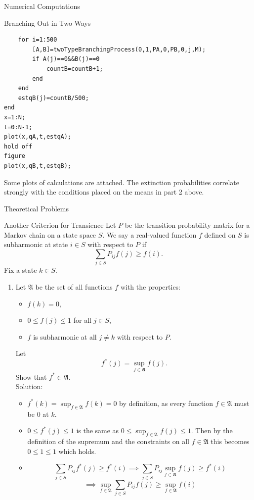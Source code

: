\documentclass[12pt]{article}
\numberwithin{equation}{section}
\begin{document}
\begin{section}{Numerical Computations}
\begin{subsection}{Branching Out in Two Ways}
\begin{enumerate}
\begin{lstlisting}
    for i=1:500
        [A,B]=twoTypeBranchingProcess(0,1,PA,0,PB,0,j,M);
        if A(j)==0&&B(j)==0
            countB=countB+1;
        end
    end
    estqB(j)=countB/500;
end
x=1:N;
t=0:N-1;
plot(x,qA,t,estqA);
hold off
figure
plot(x,qB,t,estqB);
\end{lstlisting}
Some plots of calculations are attached. The extinction probabilities correlate strongly with the conditions placed on the means in part 2 above.
\end{enumerate}
\end{subsection}
\end{section}
\begin{section}{Theoretical Problems}
\begin{subsection}{Another Criterion for Transience}
Let $P$ be the transition probability matrix for a Markov chain on a state space $S$. We say a real-valued function $f$ defined on $S$ is subharmonic at state $i\in S$ with respect to $P$ if
$$\sum_{j\in S}P_{ij}f(j)\geq f(i).$$
Fix a state $k\in S$.
\begin{enumerate}
\item Let $\mathfrak{A}$ be the set of all functions $f$ with the properties:
    \begin{itemize}
    \item $f(k)=0,$
    \item $0\leq f(j)\leq 1$ for all $j\in S$,
    \item $f$ is subharmonic at all $j\neq k$ with respect to $P$.
    \end{itemize}
    Let
    $$f^*(j)=\sup_{f\in \mathfrak{A}}f(j).$$
    Show that $f^*\in\mathfrak{A}$.\\

    Solution:\\

    \begin{itemize}
    \item $f^*(k)=\sup_{f\in \mathfrak{A}}f(k)=0$ by definition, as every function $f\in\mathfrak{A}$ must be 0 at $k$.
    \item $0\leq f^*(j)\leq 1$ is the same as $0\leq \sup_{f\in \mathfrak{A}}f(j)\leq 1$. Then by the definition of the supremum and the constraints on all $f\in\mathfrak{A}$ this becomes $0\leq 1\leq 1$ which holds.
    \item $$\sum_{j\in S}P_{ij}f^*(j)\geq f^*(i)\implies \sum_{j\in S}P_{ij}\sup_{f\in\mathfrak{A}}f(j)\geq f^*(i)$$
        $$\implies \sup_{f\in\mathfrak{A}}\sum_{j\in S}P_{ij}f(j)\geq \sup_{f\in\mathfrak{A}}f(i)$$


\end{itemize}
\end{enumerate}
\end{subsection}
\end{section}
\end{document}
